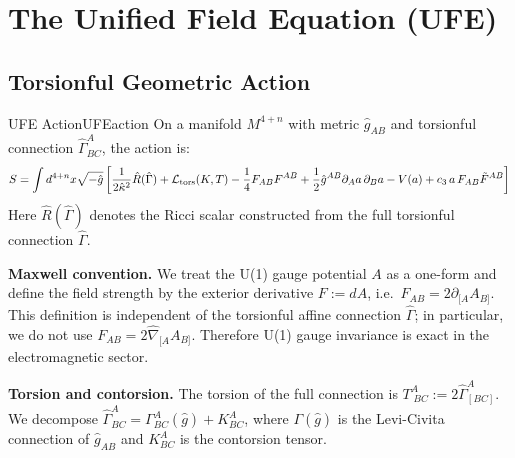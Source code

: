 \section{The Unified Field Equation (UFE)}

\subsection{Torsionful Geometric Action}

\begin{definition}{UFE Action}{UFEaction}
On a manifold $M^{4+n}$ with metric $\hat{g}_{AB}$ and torsionful connection 
$\hat{\Gamma}^A_{BC}$, the action is:
\begin{equation}
    S = \int d^{4+n}x\sqrt{-\hat{g}}\left[
        \frac{1}{2\hat{\kappa}^2}\hat{R}(\hat{\Gamma}) 
        + \mathcal{L}_{\text{tors}}(K,T) 
        - \frac{1}{4}F_{AB}F^{AB}
        + \frac{1}{2}\hat{g}^{AB}\partial_A a\,\partial_B a 
        - V(a) 
        + c_3\, a\, F_{AB}\tilde{F}^{AB}
    \right]
\end{equation}
Here $\hat{R}(\hat{\Gamma})$ denotes the Ricci scalar constructed from the full torsionful connection $\hat{\Gamma}$.
\end{definition}

\noindent\textbf{Maxwell convention.} We treat the U(1) gauge potential $A$ as a one-form and define the field strength by the exterior derivative
$F := dA$, i.e.\ $F_{AB}=2\partial_{[A}A_{B]}$. This definition is independent of the torsionful affine connection $\hat{\Gamma}$; in particular, we do not use $F_{AB}=2\hat{\nabla}_{[A}A_{B]}$. Therefore U(1) gauge invariance is exact in the electromagnetic sector.

\noindent\textbf{Torsion and contorsion.} The torsion of the full connection is $T^A_{\;BC}:=2\hat{\Gamma}^A_{[BC]}$. We decompose
$\hat{\Gamma}^A_{BC}=\Gamma^A_{BC}(\hat{g})+K^A_{BC}$, where $\Gamma(\hat{g})$ is the Levi-Civita connection of $\hat{g}_{AB}$ and $K^A_{BC}$ is the contorsion tensor.

